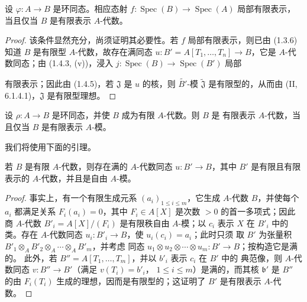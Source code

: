 \par\medskip\noindent
\begin{proposition}[1.4.6]
\label{IV.1.4.6-fr}
设 $\varphi:A\to B$ 是环同态。相应态射
$f:\operatorname{Spec}(B)\to\operatorname{Spec}(A)$ 局部有限表示，
当且仅当 $B$ 是有限表示 $A$-代数。
\end{proposition}

\begin{proof}
该条件显然充分，尚须证明其必要性。若 $f$ 局部有限表示，则已由 (1.3.6)
知道 $B$ 是有限型 $A$-代数，故存在满同态
$u:B'=A[T_1,\ldots,T_n]\to B$，它是 $A$-代数同态；由 (1.4.3, (v))，浸入
$j:\operatorname{Spec}(B)\to\operatorname{Spec}(B')$ 局部


有限表示；因此由 (1.4.5)，若 $\mathfrak J$ 是 $u$ 的核，则
$\widetilde{B'}$-模 $\widetilde{\mathfrak J}$ 是有限型的，从而由
(II, 6.1.4.1)，$\mathfrak J$ 是有限型理想。
\end{proof}

\begin{proposition}[1.4.7]
\label{IV.1.4.7-fr}
设 $\rho:A\to B$ 是环同态，并使 $B$ 成为有限 $A$-代数。则 $B$ 是
有限表示 $A$-代数，当且仅当 $B$ 是有限表示 $A$-模。
\end{proposition}

我们将使用下面的引理。

\begin{lemma}[1.4.7.1]
\label{IV.1.4.7.1-fr}
若 $B$ 是有限 $A$-代数，则存在满的 $A$-代数同态 $u:B'\to B$，其中
$B'$ 是有限且有限表示的 $A$-代数，并且是自由 $A$-模。
\end{lemma}

\begin{proof}
事实上，有一个有限生成元系 $(a_i)_{1\leq i\leq m}$，它生成
$A$-代数 $B$，并使每个 $a_i$ 都满足关系 $F_i(a_i)=0$，其中
$F_i\in A[X]$ 是次数 $>0$ 的首一多项式；因此商 $A$-代数
$B'_i=A[X]/(F_i)$ 是有限秩自由 $A$-模；以 $c_i$ 表示 $X$ 在 $B'_i$
中的类。存在 $A$-代数同态 $u_i:B'_i\to B$，使 $u_i(c_i)=a_i$；此时只须
取 $B'$ 为张量积 $B'_1\otimes_AB'_2\otimes_A\cdots\otimes_AB'_m$，并考虑
同态 $u_1\otimes u_2\otimes\cdots\otimes u_m:B'\to B$；按构造它是满的。
此外，若 $B''=A[T_1,\ldots,T_m]$，并以 $b'_i$ 表示 $c_i$ 在 $B'$ 中的
典范像，则 $A$-代数同态 $v:B''\to B'$（满足 $v(T_i)=b'_i$，
$1\leq i\leq m$）是满的，而其核 $\mathfrak b'$ 是 $B''$ 的由
$F_i(T_i)$ 生成的理想，因而是有限型的；这证明了 $B'$ 是有限表示
$A$-代数。
\end{proof}

